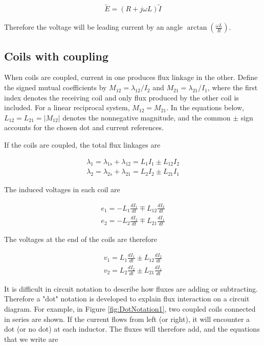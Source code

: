 \documentclass{ximera}
\begin{document}
\begin{eqnarray}
\tilde{E} = (R + j \omega L) \tilde{I}
\end{eqnarray}

Therefore the voltage will be leading current by an angle $\arctan(\frac{\omega L}{R})$.

\subsection{Coils with coupling}

When coils are coupled, current in one produces flux linkage in the other. Define the signed mutual coefficients by $M_{12}=\lambda_{12}/I_2$ and $M_{21}=\lambda_{21}/I_1$, where the first index denotes the receiving coil and only flux produced by the other coil is included. For a linear reciprocal system, $M_{12}=M_{21}$. In the equations below, $L_{12}=L_{21}=|M_{12}|$ denotes the nonnegative magnitude, and the common $\pm$ sign accounts for the chosen dot and current references.

If the coils are coupled, the total flux linkages are

\begin{eqnarray}
\lambda_1=\lambda_{1s} + \lambda_{12} = L_1 I_1 \pm L_{12} I_2 \\
\lambda_2=\lambda_{2s} + \lambda_{21} = L_2 I_2 \pm L_{21} I_1
\end{eqnarray}

The induced voltages in each coil are


\begin{eqnarray}
e_1=  -L_1 \frac{dI_1}{dt} \mp L_{12} \frac{dI_2}{dt} \\
e_2= - L_2 \frac{dI_2}{dt} \mp L_{21} \frac{dI_1}{dt}
\end{eqnarray}

The voltages at the end of the coils are therefore


\begin{eqnarray}
v_1=  L_1 \frac{dI_1}{dt} \pm L_{12} \frac{dI_2}{dt} \\
v_2= L_2 \frac{dI_2}{dt} \pm L_{21} \frac{dI_1}{dt}
\end{eqnarray}


It is difficult in circuit notation to describe how fluxes are adding or subtracting. Therefore a "dot" notation is developed to explain flux interaction on a circuit diagram. For example, in Figure \ref{fig:DotNotation1}, two coupled coils connected in series are shown. If the current flows from left (or right), it will encounter a dot (or no dot) at each inductor. The fluxes will therefore add, and the equations that we write are
\end{document}
